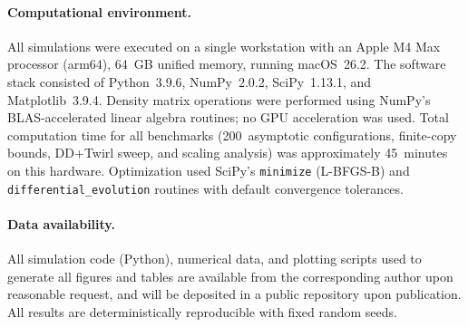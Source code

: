 \documentclass[prx,twocolumn,superscriptaddress,longbibliography,floatfix]{revtex4-2}
\begin{document}
\paragraph*{Computational environment.}
All simulations were executed on a single workstation with an Apple M4 Max processor (arm64), 64~GB unified memory, running macOS~26.2.
The software stack consisted of Python~3.9.6, NumPy~2.0.2, SciPy~1.13.1, and Matplotlib~3.9.4.
Density matrix operations were performed using NumPy's BLAS-accelerated linear algebra routines; no GPU acceleration was used.
Total computation time for all benchmarks (200~asymptotic configurations, finite-copy bounds, DD+Twirl sweep, and scaling analysis) was approximately 45~minutes on this hardware.
Optimization used SciPy's \texttt{minimize} (L-BFGS-B) and \texttt{differential\_evolution} routines with default convergence tolerances.

\paragraph*{Data availability.}
All simulation code (Python), numerical data, and plotting scripts used to generate all figures and tables are available from the corresponding author upon reasonable request, and will be deposited in a public repository upon publication.
All results are deterministically reproducible with fixed random seeds. 

    
   
\end{document}
